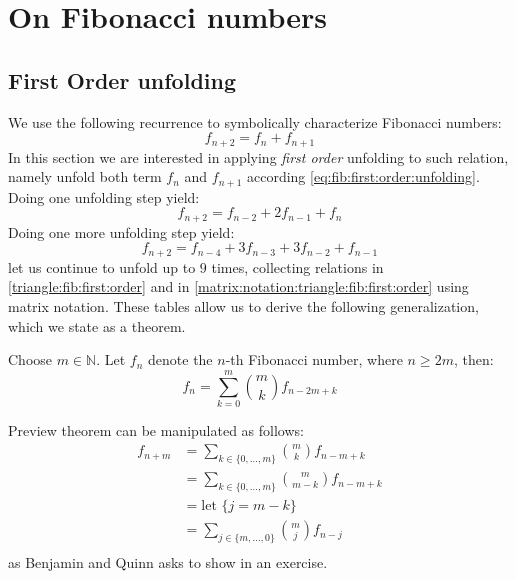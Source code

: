 
\chapter{On Fibonacci numbers}

\section{First Order unfolding}

We use the following recurrence to symbolically characterize Fibonacci numbers: 
\begin{equation}
    \label{eq:fib:first:order:unfolding}
    f_{n + 2} = f_{n} + f_{n + 1}
\end{equation}
In this section we are interested in applying \emph{first order} unfolding
to such relation, namely unfold both term $f_{n}$ and $f_{n+1}$ according
\autoref{eq:fib:first:order:unfolding}. Doing one unfolding step yield:
\begin{displaymath} 
    f_{n + 2} = f_{n - 2} + 2 f_{n - 1} + f_{n}
\end{displaymath}
Doing one more unfolding step yield:
\begin{displaymath} 
    f_{n + 2} = f_{n - 4} + 3 f_{n - 3} + 3 f_{n - 2} + f_{n - 1}
\end{displaymath}
let us continue to unfold up to $9$ times, collecting relations in 
\autoref{triangle:fib:first:order} and in \autoref{matrix:notation:triangle:fib:first:order}
using matrix notation. These tables allow us to derive the 
following generalization, which we state as a theorem.

\begin{thm} 
    Choose $m\in\mathbb{N}$. Let $f_{n}$ denote the $n$-th Fibonacci number,
    where $n \geq 2m$, then:
    \begin{displaymath} 
        f_{n} = \sum_{k=0}^{m} {{{m}\choose{k}} f_{n - 2 m + k}}
    \end{displaymath} 
\end{thm}
Preview theorem can be manipulated as follows:
\begin{displaymath} 
    \begin{split} 
        f_{n+m} &= \sum_{k\in\lbrace 0,\ldots,m\rbrace}{{{m}\choose{k}} f_{n - m + k}}\\
                &= \sum_{k\in\lbrace 0,\ldots,m\rbrace}{{{m}\choose{m-k}} f_{n - m + k}}\\
                &= \text{let } \lbrace j = m-k \rbrace\\
                &= \sum_{j\in\lbrace m,\ldots,0\rbrace}{{{m}\choose{j}} f_{n - j}}\\
    \end{split} 
\end{displaymath} 
as Benjamin and Quinn asks to show in an exercise.


